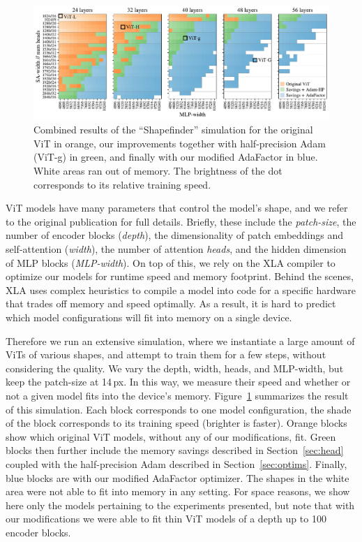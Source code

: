 \begin{figure}[t]
  \begin{center}
    \includegraphics[width=0.92\linewidth]{figs/shapefinder.pdf}
  \end{center}
  \vspace{-1.5em}
  \caption{Combined results of the ``Shapefinder'' simulation for the original ViT in orange, our improvements together with half-precision Adam (\eg ViT-g) in green, and finally with our modified AdaFactor in blue. White areas ran out of memory. The brightness of the dot corresponds to its relative training speed.}
  \label{fig:shapefinder}
\end{figure}

ViT models have many parameters that control the model's shape, and we refer to the original publication for full details.
Briefly, these include the \emph{patch-size}, the number of encoder blocks (\emph{depth}), the dimensionality of patch embeddings and self-attention (\emph{width}), the number of attention \emph{heads}, and the hidden dimension of MLP blocks (\emph{MLP-width}).
On top of this, we rely on the XLA compiler to optimize our models for runtime speed and memory footprint.
Behind the scenes, XLA uses complex heuristics to compile a model into code for a specific hardware that trades off memory and speed optimally.
As a result, it is hard to predict which model configurations will fit into memory on a single device.

Therefore we run an extensive simulation, where we instantiate a large amount of ViTs of various shapes, and attempt to train them for a few steps, without considering the quality.
We vary the depth, width, heads, and MLP-width, but keep the patch-size at 14\,px. 
In this way, we measure their speed and whether or not a given model fits into the device's memory.
Figure~\ref{fig:shapefinder} summarizes the result of this simulation.
Each block corresponds to one model configuration, the shade of the block corresponds to its training speed (brighter is faster). 
Orange blocks show which original ViT models, without any of our modifications, fit.
Green blocks then further include the memory savings described in Section~\ref{sec:head} coupled with the half-precision Adam described in Section~\ref{sec:optims}.
Finally, blue blocks are with our modified AdaFactor optimizer.
The shapes in the white area were not able to fit into memory in any setting.
For space reasons, we show here only the models pertaining to the experiments presented, but note that with our modifications we were able to fit thin ViT models of a depth up to 100 encoder blocks.

